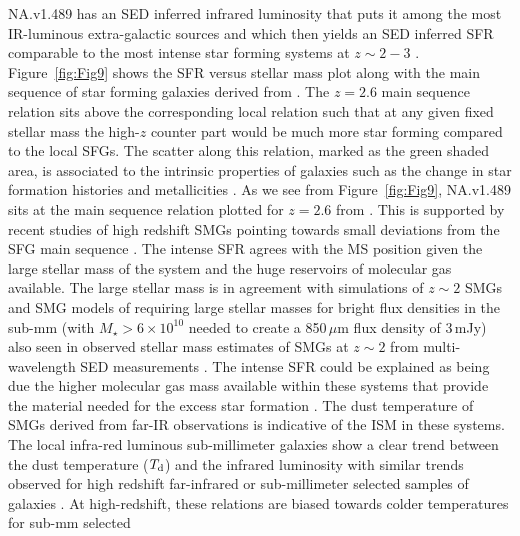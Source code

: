 \documentclass[iop,apj,useAMS,usenatbib]{emulateapj-rtx4}
\begin{document}
NA.v1.489 has an SED inferred infrared luminosity that puts it among the
most IR-luminous extra-galactic sources and which then yields an SED inferred SFR
comparable to the most intense star forming systems at $z \sim 2-3$
\citep {Greve2005, Harris2012, Magnelli2012, Fu2012, Fu2013, Ivison2013}. Figure~\ref{fig:Fig9}
shows the SFR versus stellar mass plot along with the main sequence of
star forming galaxies \citep{Kauffmann2003, Noeske2007,
  Elbaz2011, Shivaei2015} derived from \citet{Speagle2014}. The $z=2.6$ main
sequence relation sits above the corresponding local relation such
that at any given fixed stellar mass the high-$z$ counter part would
be much more star forming compared to the local SFGs. The scatter along
this relation, marked as the green shaded area, is associated to the
intrinsic properties of galaxies such as the change in star formation histories and metallicities
\citep {Brinchmann2004, Mannucci2010, Wuyts2011}. As we see from
Figure~\ref{fig:Fig9}, NA.v1.489 sits at the
main sequence relation plotted for $z=2.6$ from \citet
{Speagle2014}. This is supported by recent studies of high redshift
SMGs pointing towards small deviations from the SFG main sequence
\citep{Michalowski2012, Koprowski2014, Koprowski2016}. The intense SFR agrees with the MS
position given the large stellar mass of the system and the huge
reservoirs of molecular gas available. The large stellar mass is in
agreement with simulations of $z\sim2$ SMGs \citep{Dave2010} and SMG
models of \citet{Hayward2011} requiring large stellar masses for 
bright flux densities in the sub-mm (with $M_{\star}>6\times10^{10}$
needed to create a 850\,$\mu$m flux density of 3\,mJy) also seen in
observed stellar mass estimates of SMGs at
$z\sim2$ from multi-wavelength SED measurements
\citep{Michalowski2010, Hainline2011}. The
intense SFR could be explained as being due the
higher molecular gas mass available within these systems that provide
the material needed for the excess star formation \citep
{Riechers2010, Fu2013, Riechers2014}. The dust temperature of SMGs
derived from far-IR observations is
indicative of the ISM in these systems. The local infra-red
  luminous sub-millimeter galaxies show a clear trend between the dust
temperature ($T_{\rm d}$) and the infrared luminosity \citep{Hwang2010 ,
  Elbaz2011, Symeonidis2013} with similar trends observed for high redshift
far-infrared or sub-millimeter selected samples of galaxies
\citep{Chapman2005, Magdis2010, Magnelli2012, Casey2012, Magnelli2014,
  Bethermin2015}. At high-redshift, these
relations are biased towards colder temperatures for sub-mm selected
\end{document}

